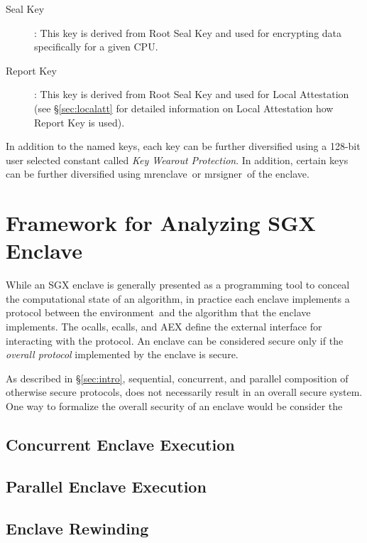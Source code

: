\documentclass[11pt]{article}
\newcommand{\secref}[1]{\S\ref{#1}}
\newcommand{\ecall}{\textsf{ecall}}
\newcommand{\ocall}{\textsf{ocall}}
\newcommand{\env}{\textsf{environment}}
\newcommand{\mrenclave}{\textsf{mrenclave}}
\newcommand{\mrsigner}{\textsf{mrsigner}}
\begin{document}
\begin{description}
      \item[Seal Key]: This key is derived from Root Seal Key and used
      for encrypting data specifically for a given CPU.

      \item[Report Key]: This key is derived from Root Seal Key and used
      for Local Attestation (see \secref{sec:localatt} for detailed
      information on Local Attestation how Report Key is used).

  \end{description}

  In addition to the named keys, each key can be further diversified using
  a 128-bit user selected constant called \textit{Key Wearout Protection}. 
  In addition, certain keys can be further diversified using \mrenclave\ 
  or \mrsigner\ of the enclave.

  \section{Framework for Analyzing SGX Enclave}
  \label{sec:analysisfwk}

  While an SGX enclave is generally presented as a programming tool
  to conceal the computational state of an algorithm, in practice each
  enclave implements a protocol between the \env\ and the algorithm that
  the enclave implements. The \ocall s, \ecall s, and AEX define the 
  external interface for interacting with the protocol. An enclave can be
  considered secure only if the \textit{overall protocol} implemented 
  by the enclave is secure.

  As described in \secref{sec:intro}, sequential, concurrent, and parallel
  composition of otherwise secure protocols, does not necessarily result
  in an overall secure system. One way to formalize the overall security
  of an enclave would be consider the 

  \subsection{Concurrent Enclave Execution}
  \label{ssec:concexec}

  \subsection{Parallel Enclave Execution}
  \label{ssec:parallelexec}

  \subsection{Enclave Rewinding}
  \label{ssec:rewinding}
\end{document}
